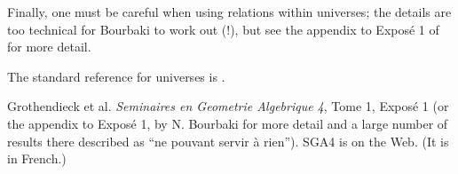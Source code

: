 \documentclass[12pt]{article}
\begin{document}
Finally, one must be careful when using relations within universes; the details are too technical for Bourbaki to work out (!), but see the appendix to Expos\'e 1 of \cite{sga4} for more detail.

The standard reference for universes is \cite{sga4}.

\begin{thebibliography}{9}
    Grothendieck et al.  \emph{Seminaires en Geometrie Algebrique 4}, Tome 1, Expos\'e 1 (or the appendix to Expos\'e 1, by N. Bourbaki for more detail and a large number of results there described as ``ne pouvant servir \`a rien'').  SGA4 is  on the Web. (It is in French.) 
\end{thebibliography}
\end{document}
